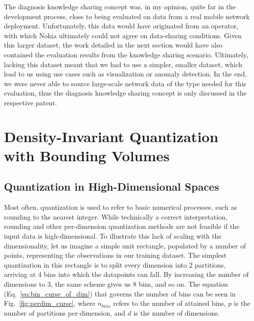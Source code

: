 			The diagnosis knowledge sharing concept was, in my opinion, quite far in the development process, close to being evaluated on data from a real mobile network deployment.
			Unfortunately, this data would have originated from an operator, with which Nokia ultimately could not agree on data-sharing conditions.
			Given this larger dataset, the work detailed in the next section would have also contained the evaluation results from the knowledge sharing scenario.
			Ultimately, lacking this dataset meant that we had to use a simpler, smaller dataset, which lead to us using use cases such as visualization or anomaly detection.
			In the end, we were never able to source large-scale network data of the type needed for this evaluation, thus the diagnosis knowledge sharing concept is only discussed in the respective patent.
	
	\section{Density-Invariant Quantization with Bounding Volumes}
		\label{cha:quantization:sec:bvq}
	
		\subsection{Quantization in High-Dimensional Spaces}
			\label{cha:quantization:sec:high_dim_problem}		
			
			Most often, quantization is used to refer to basic numerical processes, such as rounding to the nearest integer.
			While technically a correct interpretation, rounding and other per-dimension quantization methods are not feasible if the input data is high-dimensional.
			To illustrate this lack of scaling with the dimensionality, let us imagine a simple unit rectangle, populated by a number of points, representing the observations in our training dataset.
			The simplest quantization in this rectangle is to split every dimension into $2$ partitions, arriving at $4$ bins into which the datapoints can fall.
			By increasing the number of dimensions to $3$, the same scheme gives us $8$ bins, and so on.
			The equation (Eq.~\ref{eq:bin_curse_of_dim}) that governs the number of bins can be seen in Fig.~\ref{fig:perdim_curse}, where $n_{bins}$ refers to the number of attained bins, $p$ is the number of partitions per-dimension, and $d$ is the number of dimensions.
				
